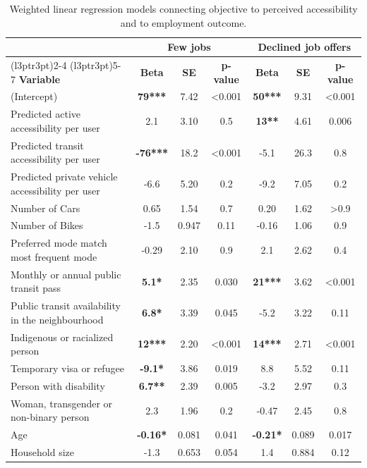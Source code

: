 \documentclass[preprint, 3p,
authoryear]{elsarticle} %
\begin{document}
\begin{table}

\caption{\label{tab:unnamed-chunk-8}\label{tab:linear_models}Weighted linear regression models connecting objective to perceived accessibility and to employment outcome. }
\centering
\begin{tabular}[t]{lcccccc}
\toprule
\multicolumn{1}{c}{ } & \multicolumn{3}{c}{\textbf{Few jobs}} & \multicolumn{3}{c}{\textbf{Declined job offers}} \\
\cmidrule(l{3pt}r{3pt}){2-4} \cmidrule(l{3pt}r{3pt}){5-7}
\textbf{Variable} & \textbf{Beta} & \textbf{SE} & \textbf{p-value} & \textbf{Beta} & \textbf{SE} & \textbf{p-value}\\
\midrule
(Intercept) & \textbf{79***} & 7.42 & <0.001 & \textbf{50***} & 9.31 & <0.001\\
Predicted active accessibility per user & 2.1 & 3.10 & 0.5 & \textbf{13**} & 4.61 & 0.006\\
Predicted transit accessibility per user & \textbf{-76***} & 18.2 & <0.001 & -5.1 & 26.3 & 0.8\\
Predicted private vehicle accessibility per user & -6.6 & 5.20 & 0.2 & -9.2 & 7.05 & 0.2\\
Number of Cars & 0.65 & 1.54 & 0.7 & 0.20 & 1.62 & >0.9\\
\addlinespace
Number of Bikes & -1.5 & 0.947 & 0.11 & -0.16 & 1.06 & 0.9\\
Preferred mode match most frequent mode & -0.29 & 2.10 & 0.9 & 2.1 & 2.62 & 0.4\\
Monthly or annual public transit pass & \textbf{5.1*} & 2.35 & 0.030 & \textbf{21***} & 3.62 & <0.001\\
Public transit availability in the neighbourhood & \textbf{6.8*} & 3.39 & 0.045 & -5.2 & 3.22 & 0.11\\
Indigenous or racialized person & \textbf{12***} & 2.20 & <0.001 & \textbf{14***} & 2.71 & <0.001\\
\addlinespace
Temporary visa or refugee & \textbf{-9.1*} & 3.86 & 0.019 & 8.8 & 5.52 & 0.11\\
Person with disability & \textbf{6.7**} & 2.39 & 0.005 & -3.2 & 2.97 & 0.3\\
Woman, transgender or non-binary person & 2.3 & 1.96 & 0.2 & -0.47 & 2.45 & 0.8\\
Age & \textbf{-0.16*} & 0.081 & 0.041 & \textbf{-0.21*} & 0.089 & 0.017\\
Household size & -1.3 & 0.653 & 0.054 & 1.4 & 0.884 & 0.12\\

\end{tabular}
\end{table}
\end{document}
